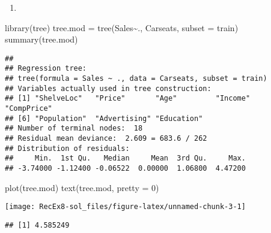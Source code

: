 \documentclass[
]{article}
\newenvironment{Shaded}{\begin{snugshade}}{\end{snugshade}}
\newcommand{\AttributeTok}[1]{\textcolor[rgb]{0.77,0.63,0.00}{#1}}
\newcommand{\DecValTok}[1]{\textcolor[rgb]{0.00,0.00,0.81}{#1}}
\newcommand{\FunctionTok}[1]{\textcolor[rgb]{0.00,0.00,0.00}{#1}}
\newcommand{\NormalTok}[1]{#1}
\newcommand{\OtherTok}[1]{\textcolor[rgb]{0.56,0.35,0.01}{#1}}
\newcommand{\SpecialCharTok}[1]{\textcolor[rgb]{0.00,0.00,0.00}{#1}}
\providecommand{\tightlist}{%
  \setlength{\itemsep}{0pt}\setlength{\parskip}{0pt}}
\begin{document}
\begin{enumerate}
\def\labelenumi{\alph{enumi})}
\setcounter{enumi}{1}
\tightlist
\item
\end{enumerate}

\begin{Shaded}
\begin{Highlighting}[]
\FunctionTok{library}\NormalTok{(tree)}
\NormalTok{tree.mod }\OtherTok{=} \FunctionTok{tree}\NormalTok{(Sales}\SpecialCharTok{\textasciitilde{}}\NormalTok{., Carseats, }\AttributeTok{subset =}\NormalTok{ train)}
\FunctionTok{summary}\NormalTok{(tree.mod)}
\end{Highlighting}
\end{Shaded}

\begin{verbatim}
## 
## Regression tree:
## tree(formula = Sales ~ ., data = Carseats, subset = train)
## Variables actually used in tree construction:
## [1] "ShelveLoc"   "Price"       "Age"         "Income"      "CompPrice"  
## [6] "Population"  "Advertising" "Education"  
## Number of terminal nodes:  18 
## Residual mean deviance:  2.609 = 683.6 / 262 
## Distribution of residuals:
##     Min.  1st Qu.   Median     Mean  3rd Qu.     Max. 
## -3.74000 -1.12400 -0.06522  0.00000  1.06800  4.47200
\end{verbatim}

\begin{Shaded}
\begin{Highlighting}[]
\FunctionTok{plot}\NormalTok{(tree.mod)}
\FunctionTok{text}\NormalTok{(tree.mod, }\AttributeTok{pretty =} \DecValTok{0}\NormalTok{)}
\end{Highlighting}
\end{Shaded}

\texttt{[image: RecEx8-sol\_files/figure-latex/unnamed-chunk-3-1]}

\begin{Shaded}
\end{Shaded}

\begin{verbatim}
## [1] 4.585249
\end{verbatim}
\end{document}
